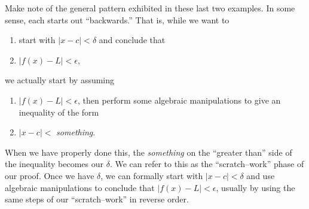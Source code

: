 
Make note of the general pattern exhibited in these last two examples. In some sense, each starts out ``backwards.'' That is, while we want to
\begin{enumerate}
	\item start with $|x-c|<\delta$ and conclude that
	\item $|f(x)-L|<\epsilon$,
\end{enumerate}
we actually start by assuming 
\begin{enumerate}
	\item $|f(x)-L|<\epsilon$, then perform some algebraic manipulations to give an inequality of the form
	\item $|x-c|<$ \textit{something}.
\end{enumerate} 
When we have properly done this, the \textit{something} on the ``greater than'' side of the inequality becomes our $\delta$. We can refer to this as the ``scratch--work'' phase of our proof. Once we have $\delta$, we can formally start with $|x-c|<\delta$ and use algebraic manipulations to conclude that $|f(x)-L|<\epsilon$, usually by using the same steps of our ``scratch--work'' in reverse order.

